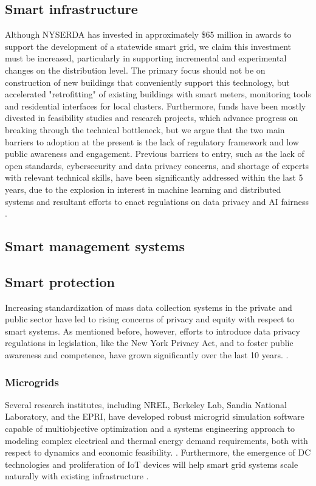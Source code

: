 \documentclass[plain]{article}
\newcommand{\1}{\mathbbm{1}}
\begin{document}
\subsection{Smart infrastructure}
Although NYSERDA has invested in approximately \$65 million in awards to support the development of a statewide smart grid, we claim this investment must be increased, particularly in supporting incremental and experimental changes on the distribution level. The primary focus should not be on construction of new buildings that conveniently support this technology, but accelerated "retrofitting" of existing buildings with smart meters, monitoring tools and residential interfaces for local clusters.
Furthermore, funds have been mostly divested in feasibility studies and research projects, which advance progress on breaking through the technical bottleneck, but we argue that the two main barriers to adoption at the present is the lack of regulatory framework and low public awareness and engagement. Previous barriers to entry, such as the lack of open standards, cybersecurity and data privacy concerns, and shortage of experts with relevant technical skills, have been significantly addressed within the last 5 years, due to the explosion in interest in machine learning and distributed systems and resultant efforts to enact regulations on data privacy and AI fairness .

\subsection{Smart management systems}


\subsection{Smart protection}
Increasing standardization of mass data collection systems in the private and public sector have led to rising concerns of privacy and equity with respect to smart systems. As mentioned before, however, efforts to introduce data privacy regulations in legislation, like the New York Privacy Act, and to foster public awareness and competence, have grown significantly over the last 10 years. . 

\subsubsection{Microgrids}
Several research institutes, including NREL, Berkeley Lab, Sandia National Laboratory, and the EPRI, have developed robust microgrid simulation software capable of multiobjective optimization and a systems engineering approach to modeling complex electrical and thermal energy demand requirements, both with respect to dynamics and economic feasibility. \cite{feng_review_2018}. Furthermore, the emergence of DC technologies and proliferation of IoT devices will help smart grid systems scale naturally with existing infrastructure \cite{feng_review_2018}.
\end{document}
